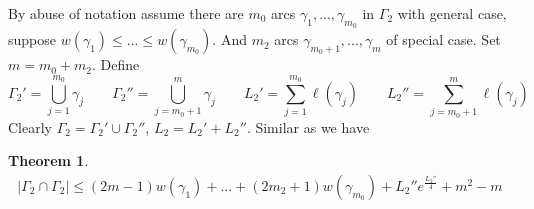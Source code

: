 \documentclass[11pt, a4paper]{article}
\newtheorem{thm}{Theorem}[section]
\theoremstyle{definition}
\theoremstyle{remark}
\newcommand{\abs}[1]{\left| #1 \right|}
\begin{document}
By abuse of notation assume there are $m_0$ arcs $\gamma_1,...,\gamma_{m_0}$ in $\Gamma_2$ with general case, suppose $w(\gamma_1)\leqslant...\leqslant w(\gamma_{m_0})$. And $m_2$ arcs $\gamma_{m_0+1},...,\gamma_{m}$ of special case. Set $m=m_0+m_2$. Define
$$\Gamma_2'=\bigcup_{j=1}^{m_0}\gamma_j\qquad \Gamma_2''=\bigcup_{j=m_0+1}^{m}\gamma_j\qquad L_2'=\sum_{j=1}^{m_0}\ell(\gamma_j)\qquad L_2''=\sum_{j=m_0+1}^{m}\ell(\gamma_j)$$
Clearly $\Gamma_2=\Gamma_2'\cup\Gamma_2''$, $L_2=L_2'+L_2''$. 
Similar as \cite[Lemma 2.5]{Y2805} we have
\begin{thm}
\begin{align}\label{ttt}
  \abs{\Gamma_2\cap\Gamma_2}\leqslant(2m-1)w(\gamma_1)+...+(2m_2+1)w(\gamma_{m_0})+{L_2''}e^{\frac{L_2''}4}+m^2-m
\end{align}
\end{thm}
\end{document}

